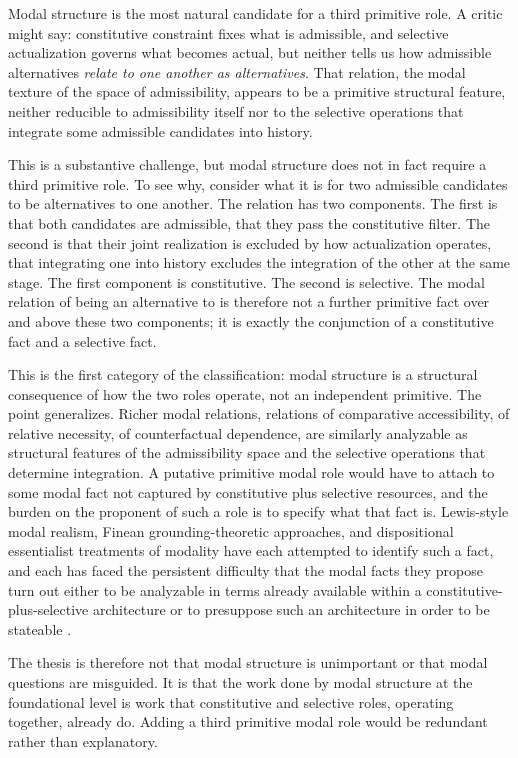 \documentclass[11pt]{article}
\theoremstyle{foundation}
\begin{document}
Modal structure is the most natural candidate for a third primitive role. A critic might say: constitutive constraint fixes what is admissible, and selective actualization governs what becomes actual, but neither tells us how admissible alternatives \emph{relate to one another as alternatives}. That relation, the modal texture of the space of admissibility, appears to be a primitive structural feature, neither reducible to admissibility itself nor to the selective operations that integrate some admissible candidates into history.

This is a substantive challenge, but modal structure does not in fact require a third primitive role. To see why, consider what it is for two admissible candidates to be alternatives to one another. The relation has two components. The first is that both candidates are admissible, that they pass the constitutive filter. The second is that their joint realization is excluded by how actualization operates, that integrating one into history excludes the integration of the other at the same stage. The first component is constitutive. The second is selective. The modal relation of being an alternative to is therefore not a further primitive fact over and above these two components; it is exactly the conjunction of a constitutive fact and a selective fact.

This is the first category of the classification: modal structure is a structural consequence of how the two roles operate, not an independent primitive. The point generalizes. Richer modal relations, relations of comparative accessibility, of relative necessity, of counterfactual dependence, are similarly analyzable as structural features of the admissibility space and the selective operations that determine integration. A putative primitive modal role would have to attach to some modal fact not captured by constitutive plus selective resources, and the burden on the proponent of such a role is to specify what that fact is. Lewis-style modal realism, Finean grounding-theoretic approaches, and dispositional essentialist treatments of modality have each attempted to identify such a fact, and each has faced the persistent difficulty that the modal facts they propose turn out either to be analyzable in terms already available within a constitutive-plus-selective architecture or to presuppose such an architecture in order to be stateable \citep{Lewis1986,Fine2012,Bird2007}.

The thesis is therefore not that modal structure is unimportant or that modal questions are misguided. It is that the work done by modal structure at the foundational level is work that constitutive and selective roles, operating together, already do. Adding a third primitive modal role would be redundant rather than explanatory.
\end{document}

